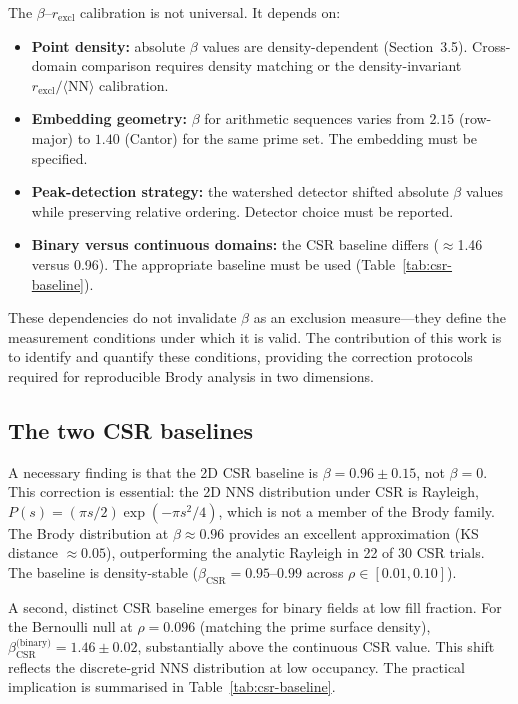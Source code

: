 \documentclass[final,3p,times,twocolumn]{elsarticle}
\theoremstyle{definition}
\begin{document}
The $\beta$--$r_{\text{excl}}$ calibration is not universal.
It depends on:
\begin{itemize}
  \item \textbf{Point density:} absolute $\beta$ values are
density-dependent (Section~3.5). Cross-domain comparison requires
density matching or the density-invariant
$r_{\text{excl}}/\langle\text{NN}\rangle$ calibration.
  \item \textbf{Embedding geometry:} $\beta$ for arithmetic
sequences varies from $2.15$ (row-major) to $1.40$ (Cantor) for
the same prime set. The embedding must be specified.
  \item \textbf{Peak-detection strategy:} the watershed detector
shifted absolute $\beta$ values while preserving relative
ordering. Detector choice must be reported.
  \item \textbf{Binary versus continuous domains:} the CSR baseline
differs ($\approx$1.46 versus 0.96). The appropriate baseline
must be used (Table~\ref{tab:csr-baseline}).
\end{itemize}
These dependencies do not invalidate $\beta$ as an exclusion
measure---they define the measurement conditions under which it
is valid. The contribution of this work is to identify and quantify
these conditions, providing the correction protocols required for
reproducible Brody analysis in two dimensions.

\subsection{The two CSR baselines}

A necessary finding is that the 2D CSR baseline is
$\beta=0.96\pm0.15$, not $\beta=0$. This correction is essential:
the 2D NNS distribution under CSR is Rayleigh,
$P(s)=(\pi s/2)\exp(-\pi s^2/4)$, which is not a member of the
Brody family. The Brody distribution at $\beta\approx0.96$ provides
an excellent approximation (KS distance $\approx0.05$), outperforming
the analytic Rayleigh in 22 of 30 CSR trials. The baseline is
density-stable ($\beta_{\text{CSR}}=0.95$--$0.99$ across
$\rho\in[0.01,0.10]$).

A second, distinct CSR baseline emerges for binary fields at low fill
fraction. For the Bernoulli null at $\rho=0.096$ (matching the prime
surface density), $\beta_{\text{CSR}}^{\text{(binary)}}=1.46\pm0.02$,
substantially above the continuous CSR value. This shift reflects the
discrete-grid NNS distribution at low occupancy. The practical
implication is summarised in Table~\ref{tab:csr-baseline}.
\end{document}
